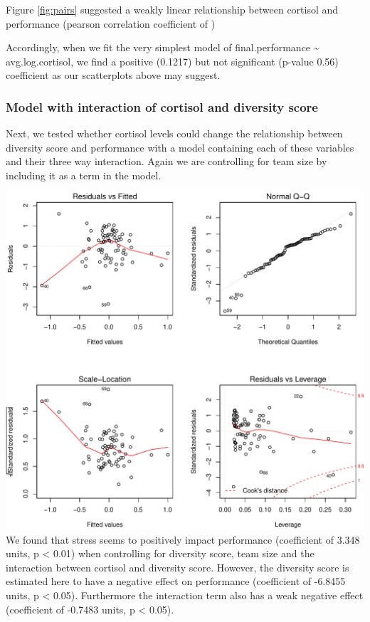 \documentclass[]{article}
\begin{document}
Figure \ref{fig:pairs} suggested a weakly linear relationship between
cortisol and performance (pearson correlation coefficient of )

Accordingly, when we fit the very simplest model of final.performance
\textasciitilde{} avg.log.cortisol, we find a positive (0.1217) but not
significant (p-value 0.56) coefficient as our scatterplots above may
suggest.

\hypertarget{model-with-interaction-of-cortisol-and-diversity-score}{%
\subsubsection{Model with interaction of cortisol and diversity
score}\label{model-with-interaction-of-cortisol-and-diversity-score}}

Next, we tested whether cortisol levels could change the relationship
between diversity score and performance with a model containing each of
these variables and their three way interaction. Again we are
controlling for team size by including it as a term in the model.

\includegraphics{19_10_02_hw5_q1_files/figure-latex/stress-1.pdf} We
found that stress seems to positively impact performance (coefficient of
3.348 units, p \textless{} 0.01) when controlling for diversity score,
team size and the interaction between cortisol and diversity score.
However, the diversity score is estimated here to have a negative effect
on performance (coefficient of -6.8455 units, p \textless{} 0.05).
Furthermore the interaction term also has a weak negative effect
(coefficient of -0.7483 units, p \textless{} 0.05).
\end{document}
